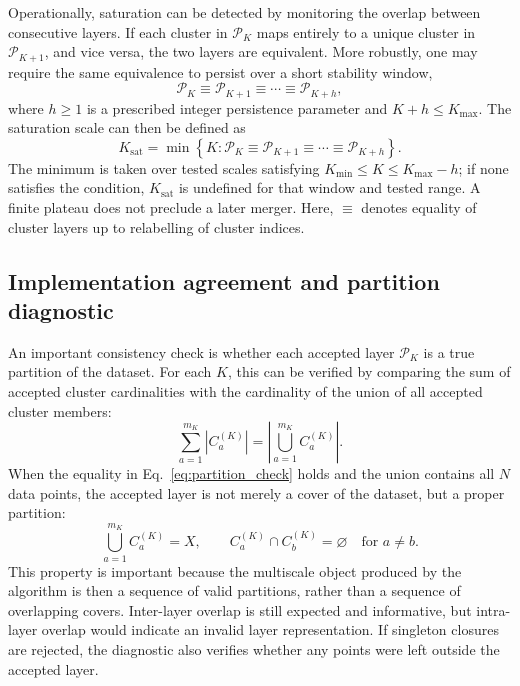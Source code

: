 \documentclass[pdflatex,sn-basic,Numbered]{sn-jnl}
\newcommand{\calP}{\mathcal{P}}
\begin{document}
Operationally, saturation can be detected by monitoring the overlap between
consecutive layers. If each cluster in $\calP_K$ maps entirely to a unique
cluster in $\calP_{K+1}$, and vice versa, the two layers are equivalent.
More robustly, one may require the same equivalence to persist over a short
stability window,
\begin{equation}
\calP_K
\equiv
\calP_{K+1}
\equiv
\cdots
\equiv
\calP_{K+h},
\label{eq:partition_stability_window}
\end{equation}
where $h\geq1$ is a prescribed integer persistence parameter and
$K+h\leq K_{\max}$. The saturation scale can
then be defined as
\begin{equation}
K_{\mathrm{sat}}
=
\min
\left\{
K:
\calP_K
\equiv
\calP_{K+1}
\equiv
\cdots
\equiv
\calP_{K+h}
\right\}.
\label{eq:ksat}
\end{equation}
The minimum is taken over tested scales satisfying
$K_{\min}\leq K\leq K_{\max}-h$; if none satisfies the condition,
$K_{\mathrm{sat}}$ is undefined for that window and tested range. A finite
plateau does not preclude a later merger. Here, $\equiv$ denotes equality
of cluster layers up to relabelling of cluster indices.


\subsection{Implementation agreement and partition diagnostic}\label{sec:partition_diagnostic}

An important consistency check is whether each accepted layer $\calP_K$ is a true partition of the dataset. For each $K$, this can be verified by comparing the sum of accepted cluster cardinalities with the cardinality of the union of all accepted cluster members:
\begin{equation}
\sum_{a=1}^{m_K}|C_a^{(K)}|=\left|\bigcup_{a=1}^{m_K}C_a^{(K)}\right|.
\label{eq:partition_check}
\end{equation}
When the equality in Eq.~\eqref{eq:partition_check} holds and the union contains all $N$ data points, the accepted layer is not merely a cover of the dataset, but a proper partition:
\begin{equation}
\bigcup_{a=1}^{m_K} C_a^{(K)}=X,
\qquad
C_a^{(K)}\cap C_b^{(K)}=\varnothing
\quad\text{for }a\neq b.
\end{equation}
This property is important because the multiscale object produced by the algorithm is then a sequence of valid partitions, rather than a sequence of overlapping covers. Inter-layer overlap is still expected and informative, but intra-layer overlap would indicate an invalid layer representation. If singleton closures are rejected, the diagnostic also verifies whether any points were left outside the accepted layer.
\end{document}
